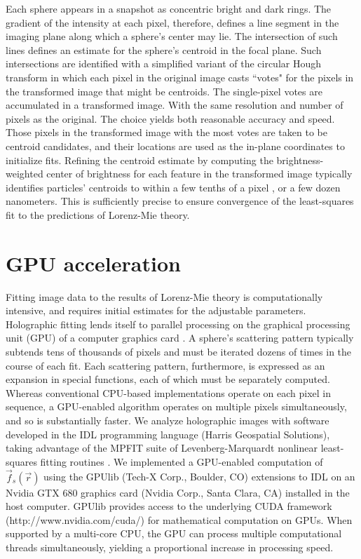 Each sphere appears in a snapshot as concentric bright and dark rings. The gradient of the intensity at each pixel, therefore, defines a line segment in the imaging plane along which a sphere's center may lie. The intersection of such lines defines an estimate for the sphere's centroid in the focal plane. Such intersections are identified with a simplified variant of the circular Hough transform \cite{duda72} in which each pixel in the original image casts ``votes" for the pixels in the transformed image that might be centroids. The single-pixel votes are accumulated in a transformed image. 
With the same resolution and number of pixels as the original. The choice yields both reasonable accuracy and speed. Those pixels in the transformed image with the most votes are taken to be centroid candidates, and their locations are used as the in-plane coordinates to initialize fits. Refining the centroid estimate by computing the brightness-weighted center of brightness for each feature in the transformed image typically identifies particles' centroids to within a few tenths of a pixel \cite{crocker96}, or a few dozen nanometers. This is sufficiently precise to ensure convergence of the least-squares fit to the predictions of Lorenz-Mie theory.

\section{GPU acceleration}
\label{sec:GPU}
Fitting image data to the results of Lorenz-Mie theory is computationally
intensive, and requires initial estimates for the adjustable parameters. Holographic fitting lends itself to parallel processing on the graphical processing unit (GPU) of a computer graphics card \cite{owens07}. A sphere's scattering pattern typically subtends tens of thousands of pixels and must be iterated dozens of times in the course of each fit. Each scattering pattern, furthermore, is expressed as an expansion in special functions, each of which must be separately computed. Whereas conventional CPU-based implementations operate on each pixel in sequence, a GPU-enabled algorithm operates
on multiple pixels simultaneously, and so is substantially faster.
We analyze holographic images with software developed in the IDL programming language (Harris Geospatial Solutions), taking advantage of the MPFIT suite of Levenberg-Marquardt nonlinear least-squares fitting routines \cite{markwardt09}. We implemented a GPU-enabled computation of $\vec{f}_s (\vec{r})$ using the GPUlib \cite{messmer08} (Tech-X Corp., Boulder, CO) extensions to IDL on an Nvidia GTX 680 graphics card (Nvidia Corp., Santa Clara, CA) installed in the host computer. GPUlib provides access to the underlying CUDA framework (http://www.nvidia.com/cuda/) for mathematical computation on GPUs. When supported by a multi-core CPU, the GPU can process multiple computational threads simultaneously, yielding a proportional increase in processing speed.

